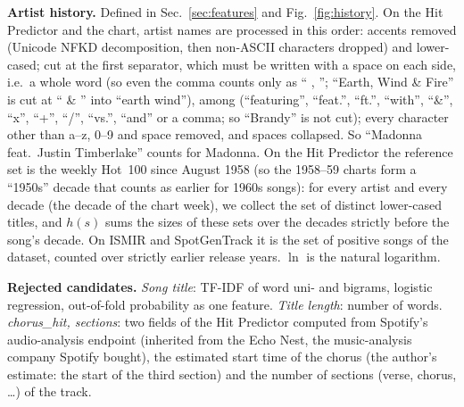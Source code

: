 \textbf{Artist history.} Defined in Sec.~\ref{sec:features} and Fig.~\ref{fig:history}. On the Hit Predictor
and the chart, artist names are processed in this order: accents removed (Unicode NFKD decomposition, then
non-ASCII characters dropped) and lower-cased; cut at the first
separator, which must be written with a space on each side, i.e.\ a whole word (so even the comma counts only
as `` , ''; ``Earth, Wind \& Fire'' is cut at `` \& '' into ``earth wind''), among (``featuring'', ``feat.'', ``ft.'', ``with'', ``\&'',
``x'', ``+'', ``/'', ``vs.'', ``and'' or a comma; so ``Brandy'' is not cut); every character other than a--z, 0--9
and space removed, and spaces collapsed. So ``Madonna feat.\ Justin Timberlake'' counts for Madonna.
On the Hit Predictor the reference set is the weekly Hot~100 since August 1958 (so the 1958--59 charts form a
``1950s'' decade that counts as earlier for 1960s songs): for every artist and every
decade (the decade of the chart week), we collect the set of distinct lower-cased titles, and $h(s)$ sums the
sizes of these sets over the decades strictly before the song's decade. On ISMIR and SpotGenTrack it is the set
of positive songs of the dataset, counted over strictly earlier release years. $\ln$ is the natural logarithm.

\textbf{Rejected candidates.} \emph{Song title}: TF-IDF of word uni- and bigrams, logistic regression,
out-of-fold probability as one feature. \emph{Title length}: number of words. \emph{chorus\_hit,
sections}: two fields of the Hit Predictor computed from Spotify's audio-analysis endpoint (inherited from the
Echo Nest, the music-analysis company Spotify bought), the estimated
start time of the chorus (the author's estimate: the start of the third section) and the number of sections (verse, chorus, \dots) of the track.

